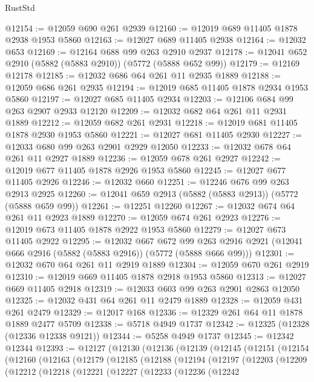 \begin{lexlean}{RustStd}
\begin{coremodule}
@12154 := @12059 @690 @261 @2939
@12160 := @12019 @689 @11405 @1878 @2938 @1953 @5860
@12163 := @12027 @689 @11405 @2938
@12164 := @12032 @653
@12169 := @12164 @688 @99 @263 @2910 @2937
@12178 := @12041 @652 @2910 (@5882 (@5883 @2910)) (@5772 (@5888 @652 @99))
@12179 := @12169 @12178
@12185 := @12032 @686 @64 @261 @11 @2935 @1889
@12188 := @12059 @686 @261 @2935
@12194 := @12019 @685 @11405 @1878 @2934 @1953 @5860
@12197 := @12027 @685 @11405 @2934
@12203 := @12106 @684 @99 @263 @2907 @2933 @12120
@12209 := @12032 @682 @64 @261 @11 @2931 @1889
@12212 := @12059 @682 @261 @2931
@12218 := @12019 @681 @11405 @1878 @2930 @1953 @5860
@12221 := @12027 @681 @11405 @2930
@12227 := @12033 @680 @99 @263 @2901 @2929 @12050
@12233 := @12032 @678 @64 @261 @11 @2927 @1889
@12236 := @12059 @678 @261 @2927
@12242 := @12019 @677 @11405 @1878 @2926 @1953 @5860
@12245 := @12027 @677 @11405 @2926
@12246 := @12032 @660
@12251 := @12246 @676 @99 @263 @2913 @2925
@12260 := @12041 @659 @2913 (@5882 (@5883 @2913)) (@5772 (@5888 @659 @99))
@12261 := @12251 @12260
@12267 := @12032 @674 @64 @261 @11 @2923 @1889
@12270 := @12059 @674 @261 @2923
@12276 := @12019 @673 @11405 @1878 @2922 @1953 @5860
@12279 := @12027 @673 @11405 @2922
@12295 := @12032
    @667
    @672
    @99
    @263
    @2916
    @2921
    (@12041 @666 @2916 (@5882 (@5883 @2916)) (@5772 (@5888 @666 @99)))
@12301 := @12032 @670 @64 @261 @11 @2919 @1889
@12304 := @12059 @670 @261 @2919
@12310 := @12019 @669 @11405 @1878 @2918 @1953 @5860
@12313 := @12027 @669 @11405 @2918
@12319 := @12033 @603 @99 @263 @2901 @2863 @12050
@12325 := @12032 @431 @64 @261 @11 @2479 @1889
@12328 := @12059 @431 @261 @2479
@12329 := @12017 @168
@12336 := @12329 @261 @64 @11 @1878 @1889 @2477 @5709
@12338 := @5718 @4949 @1737
@12342 := @12325 (@12328 (@12336 @12338 @9121))
@12344 := @5258 @4949 @1737
@12345 := @12342 @12344
@12393 := @12127
    (@12130
      (@12136
        (@12139
          (@12145
            (@12151
              (@12154
                (@12160
                  (@12163
                    (@12179
                      (@12185
                        (@12188
                          (@12194
                            (@12197
                              (@12203
                                (@12209
                                  (@12212
                                    (@12218
                                      (@12221
                                        (@12227
                                          (@12233
                                            (@12236
                                              (@12242

\end{coremodule}
\end{lexlean}

